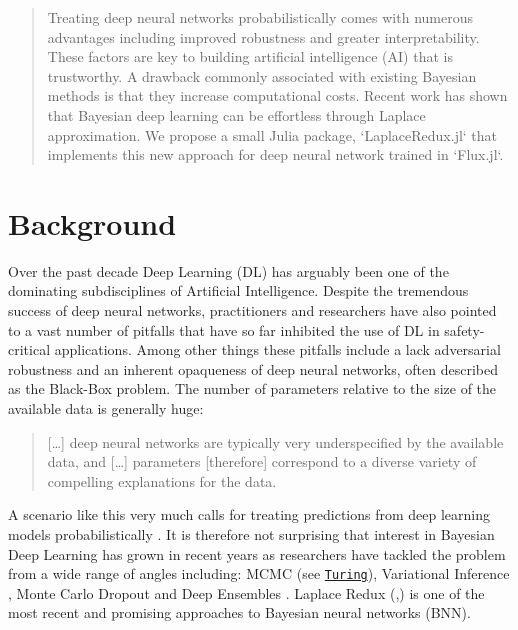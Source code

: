 \documentclass{juliacon}
\begin{document}


\maketitle

\begin{abstract}

Treating deep neural networks probabilistically comes with numerous advantages including improved robustness and greater interpretability. These factors are key to building artificial intelligence (AI) that is trustworthy. A drawback commonly associated with existing Bayesian methods is that they increase computational costs. Recent work has shown that Bayesian deep learning can be effortless through Laplace approximation. We propose a small Julia package, `LaplaceRedux.jl` that implements this new approach for deep neural network trained in `Flux.jl`.

\end{abstract}

\hypertarget{sec-intro}{%
\section{Background}\label{sec-intro}}

Over the past decade Deep Learning (DL) has arguably been one of the
dominating subdisciplines of Artificial Intelligence. Despite the
tremendous success of deep neural networks, practitioners and
researchers have also pointed to a vast number of pitfalls that have so
far inhibited the use of DL in safety-critical applications. Among other
things these pitfalls include a lack adversarial robustness
\cite{goodfellow2014explaining} and an inherent opaqueness of deep
neural networks, often described as the Black-Box problem. The number of
parameters relative to the size of the available data is generally huge:

\begin{quote}
{[}\ldots{]} deep neural networks are typically very underspecified by
the available data, and {[}\ldots{]} parameters {[}therefore{]}
correspond to a diverse variety of compelling explanations for the data.
\cite{wilson2020case}
\end{quote}

A scenario like this very much calls for treating predictions from deep
learning models probabilistically \cite{wilson2020case}. It is therefore
not surprising that interest in Bayesian Deep Learning has grown in
recent years as researchers have tackled the problem from a wide range
of angles including: MCMC (see
\href{https://turing.ml/dev/tutorials/03-bayesian-neural-network/}{\texttt{Turing}}),
Variational Inference \cite{blundell2015weight}, Monte Carlo Dropout
\cite{gal2016dropout} and Deep Ensembles
\cite{lakshminarayanan2016simple}. Laplace Redux
(\cite{immer2020improving},\cite{daxberger2021laplace}) is one of the
most recent and promising approaches to Bayesian neural networks (BNN).
\end{document}

